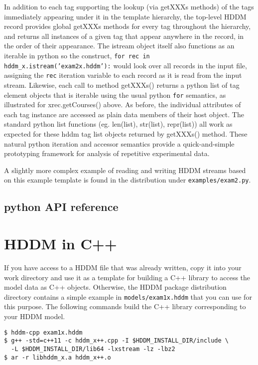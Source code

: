 \documentclass{revtex4}
\begin{document}
In addition to each tag supporting the lookup (via getXXXs methods) of the
tags immediately appearing under it in the template hierarchy, the 
top-{}level HDDM record provides global getXXXs methods for every tag
throughout the hierarchy, and returns all instances of a given tag that
appear anywhere in the record, in the order of their appearance. The
istream object itself also functions as an iterable in python so the
construct, \texttt{for rec in hddm\_x.istream('exam2x.hddm'):} would
look over all records in the input file, assigning the \texttt{rec}
iteration variable to each record as it is read from the input stream.
Likewise, each call to method getXXXs() returns a python list of tag
element objects that is iterable using the usual python \texttt{for}
semantics, as illustrated for xrec.getCourses() above. As before, the
individual attributes of each tag instance are accessed as plain data 
members of their host object. The standard python list functions (eg.
len(list), str(list), repr(list)) all work as expected for these hddm
tag list objects returned by getXXXs() method. These natural python
iteration and accessor semantics provide a quick-{}and-{}simple
prototyping framework for analysis of repetitive experimental data.

A slightly more complex example of reading and writing HDDM streams
based on this example template is found in the distribution under
\texttt{examples/exam2.py}.

\subsection{python API reference}



\section{HDDM in C++}

If you have access to a HDDM file that was already written, copy it into your
work directory and use it as a template for building a C++ library to access
the model data as C++ objects. Otherwise, the HDDM package distribution
directory contains a simple example in \texttt{models/exam1x.hddm} that you
can use for this purpose. The following commands build the C++ library
corresponding to your HDDM model.

\vspace{0.5cm}
\begin{minipage}{12cm}
\begin{verbatim}
$ hddm-cpp exam1x.hddm
$ g++ -std=c++11 -c hddm_x++.cpp -I $HDDM_INSTALL_DIR/include \
  -L $HDDM_INSTALL_DIR/lib64 -lxstream -lz -lbz2
$ ar -r libhddm_x.a hddm_x++.o
\end{verbatim}
\end{minipage}
\vspace{0.5cm}
\end{document}

